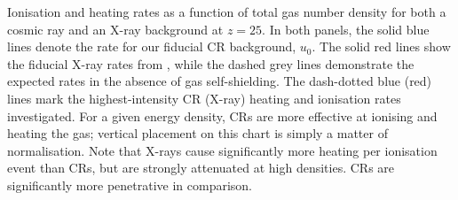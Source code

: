 \label{fig:khrates}
Ionisation and heating rates as a function of total gas number density for both a cosmic ray and an X-ray background at $z=25$. 
In both panels, the solid blue lines denote the rate for our fiducial CR background, $u_0$. The solid red lines show the fiducial X-ray rates from \citet{Hummeletal2015}, while the dashed grey lines demonstrate the expected rates in the absence of gas self-shielding.  
The dash-dotted blue (red) lines mark the highest-intensity CR (X-ray) heating and ionisation rates investigated. 
For a given energy density, CRs are more effective at ionising and heating the gas; vertical placement on this chart is simply a matter of normalisation. 
Note that X-rays cause significantly more heating per ionisation event than CRs, but are strongly attenuated at high densities. CRs are significantly more penetrative in comparison.